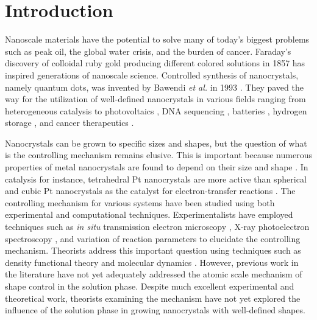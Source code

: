 
\section{Introduction}


Nanoscale materials have the potential to solve many of today's biggest problems such as peak oil, the global water crisis, and the burden of cancer.
Faraday's discovery of colloidal ruby gold producing different colored solutions in 1857 \cite{Faraday_1857,Thompson_2007} has inspired generations of nanoscale science.
Controlled synthesis of nanocrystals, namely quantum dots, was invented by Bawendi \textit{et al.} in 1993 \cite{hakimi1993quantum,Murray_2000}.
They paved the way for the utilization of well-defined nanocrystals in various fields ranging from heterogeneous catalysis \cite{astruc2008nanoparticles,Astruc_2006} to photovoltaics \cite{Atwater_2010}, DNA sequencing \cite{McNally_2010}, batteries \cite{Panniello_2014}, hydrogen storage \cite{Jena_2011,Ramos_Castillo_2015}, and cancer therapeutics \cite{Jain_2010,Kim_2010}.

Nanocrystals can be grown to specific sizes and shapes, but the question of what is the controlling mechanism remains elusive.
This is important because numerous properties of metal nanocrystals are found to depend on their size \cite{Roduner_2006} and shape \cite{Xia_2008}.
In catalysis for instance, tetrahedral Pt nanocrystals are more active than spherical and cubic Pt nanocrystals as the catalyst for electron-transfer reactions \cite{Narayanan_2005}.
The controlling mechanism for various systems have been studied using both experimental and computational techniques.
Experimentalists have employed techniques such as \textit{in situ} transmission electron microscopy \cite{Liao_2014,Woehl_2014}, X-ray photoelectron spectroscopy \cite{Gao_2004,Park_2014,Huang_1996,Kedia_2012,Bonet_2000}, and variation of reaction parameters \cite{Personick_2013,Xia_2012,Zeng_2010,Zhang_1996,Chang_2011,Zhu_2011} to elucidate the controlling mechanism.
Theorists address this important question using techniques such as density functional theory \cite{Kilin_2008,Al_Saidi_2012,Saidi_2013,Zhang_2008} and molecular dynamics \cite{Zhou_2014}.
However, previous work in the literature have not yet adequately addressed the atomic scale mechanism of shape control in the solution phase.
Despite much excellent experimental and theoretical work, theorists examining the mechanism have not yet explored the influence of the solution phase in growing nanocrystals with well-defined shapes.

  